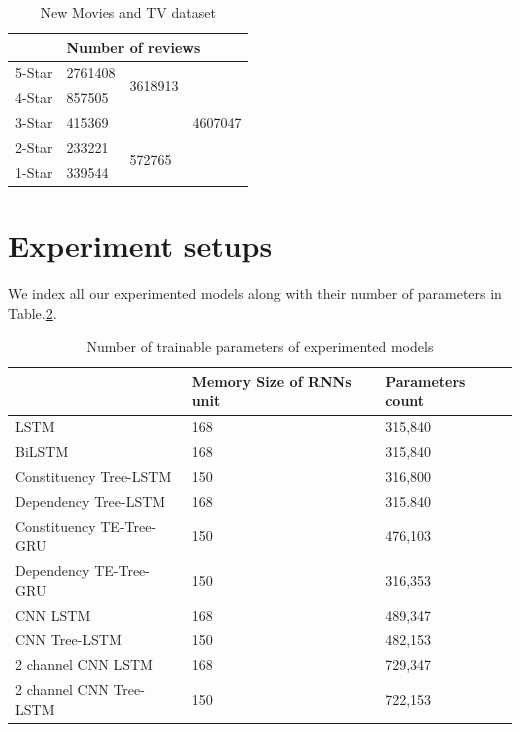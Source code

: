 \begin{table}[H]
    \centering
    \caption{New Movies and TV dataset}
    \label{table:moviereview_5}
    \begin{tabular}{@{}lllc@{}}
        \toprule
        & \multicolumn{3}{l}{Number of reviews}                         \\ \midrule
        5-Star & 2761408 & \multirow{2}{*}{3618913} & \multirow{5}{*}{4607047} \\ \cmidrule(r){1-2}
        4-Star & 857505  &                          &                          \\ \cmidrule(r){1-3}
        3-Star & \multicolumn{2}{l}{415369}         &                          \\ \cmidrule(r){1-3}
        2-Star & 233221  & \multirow{2}{*}{572765}  &                          \\ \cmidrule(r){1-2}
        1-Star & 339544  &                          &                          \\ \bottomrule
    \end{tabular}
\end{table}

\section{Experiment setups}
We index all our experimented models along with their number of parameters in Table.\ref{table:paramtable}.

\begin{table}[H]
    \centering
    \caption{Number of trainable parameters of experimented models}
    \label{table:paramtable}
    \begin{tabular}{lll}
        ~ & Memory Size of RNNs unit & Parameters count \\ \hline
        LSTM                     & 168         & 315,840          \\
        BiLSTM                   & 168         & 315,840          \\
        Constituency Tree-LSTM   & 150         & 316,800          \\
        Dependency Tree-LSTM     & 168         & 315.840          \\
        Constituency TE-Tree-GRU & 150         & 476,103          \\
        Dependency TE-Tree-GRU   & 150         & 316,353          \\
        CNN LSTM                 & 168         & 489,347          \\
        CNN Tree-LSTM            & 150         & 482,153          \\
        2 channel CNN LSTM       & 168         & 729,347          \\
        2 channel CNN Tree-LSTM  & 150         & 722,153
    \end{tabular}
\end{table}
